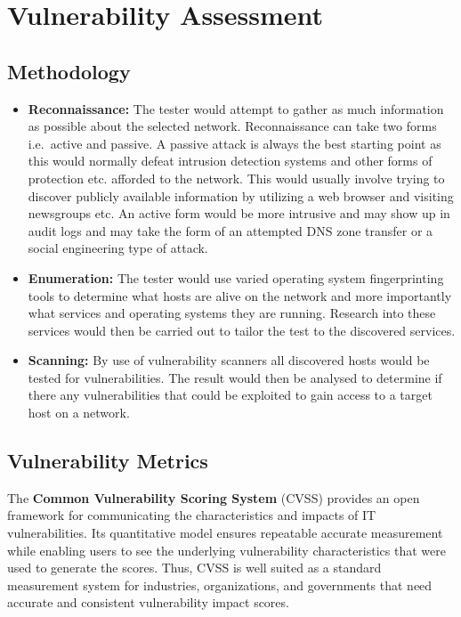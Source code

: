 

\chapter{Vulnerability Assessment}\label{ch:vulnass}

  \section{Methodology}\label{sec:methodology-utilized}

    \begin{itemize}
      \item \textbf{Reconnaissance:}
        The tester would attempt to gather as much information as possible about
        the selected network. Reconnaissance can take two forms i.e.~active and
        passive. A passive attack is always the best starting point as this
        would normally defeat intrusion detection systems and other forms of
        protection etc. afforded to the network. This would usually involve
        trying to discover publicly available information by utilizing a web
        browser and visiting newsgroups etc. An active form would be more
        intrusive and may show up in audit logs and may take the form of an
        attempted DNS zone transfer or a social engineering type of attack.
      \item \textbf{Enumeration:}
        The tester would use varied operating system fingerprinting tools to
        determine what hosts are alive on the network and more importantly what
        services and operating systems they are running. Research into these
        services would then be carried out to tailor the test to the discovered
        services.
      \item \textbf{Scanning:}
        By use of vulnerability scanners all discovered hosts would be tested
        for vulnerabilities. The result would then be analysed to determine if
        there any vulnerabilities that could be exploited to gain access to a
        target host on a network.
    \end{itemize}

  \section{Vulnerability Metrics}\label{sec:vulnerability-metrics}

    The \textbf{Common Vulnerability Scoring System} (CVSS) provides an open
    framework for communicating the characteristics and impacts of IT
    vulnerabilities. Its quantitative model ensures repeatable accurate
    measurement while enabling users to see the underlying vulnerability
    characteristics that were used to generate the scores. Thus, CVSS is
    well suited as a standard measurement system for industries,
    organizations, and governments that need accurate and consistent
    vulnerability impact scores.

